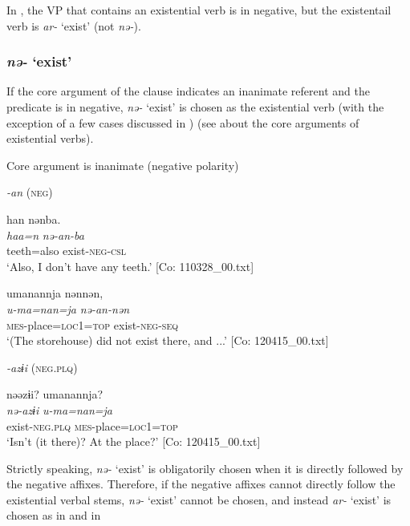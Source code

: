 In , the VP that contains an existential verb is in negative, but the existentail verb is \textit{ar-} ‘exist’ (not \textit{nə-}).

\subsubsection{\textit{nə-} ‘exist’}

If the core argument of the clause indicates an inanimate referent and the predicate is in negative, \textit{nə-} ‘exist’ is chosen as the existential verb (with the exception of a few cases discussed in ) (see  about the core arguments of existential verbs).

\ea\label{ex:8-34}
  Core argument is inanimate (negative polarity)

  \textit{-an} (\textsc{neg})


{\TM}
\glll  han  nənba.\\
\textit{haa=n}  \textit{nə-an-ba}\\
teeth=also  exist-\textsc{neg}-\textsc{csl}\\
\glt ‘Also, I don’t have any teeth.’ [Co: 110328\_00.txt]

\ex
{\TM}
\glll  umanannja  nənnən,\\
\textit{u-ma=nan=ja}  \textit{nə-an-nən}\\
\textsc{mes}-place=\textsc{loc}1=\textsc{top}  exist-\textsc{neg}-\textsc{seq}\\
\glt ‘(The storehouse) did not exist there, and ...’ [Co: 120415\_00.txt]
\z

  \textit{-azɨi} (\textsc{neg}.\textsc{plq})



{\TM}
\glll  nəəzɨi?  umanannja?\\
\textit{nə-azɨi}  \textit{u-ma=nan=ja}\\
exist-\textsc{neg}.\textsc{plq}  \textsc{mes}-place=\textsc{loc}1=\textsc{top}\\
\glt ‘Isn’t (it there)? At the place?’ [Co: 120415\_00.txt]
\z
\z

Strictly speaking, \textit{nə-} ‘exist’ is obligatorily chosen when it is directly followed by the negative affixes. Therefore, if the negative affixes cannot directly follow the existential verbal stems, \textit{nə-} ‘exist’ cannot be chosen, and instead \textit{ar-} ‘exist’ is chosen as in  and  in 

